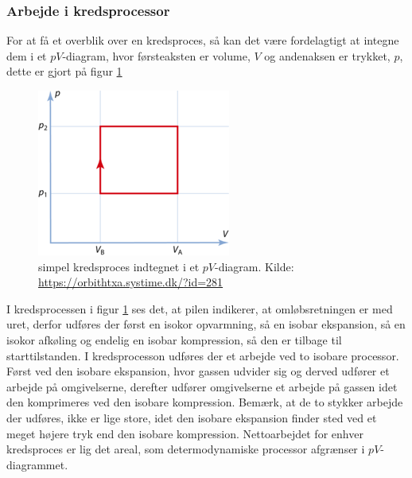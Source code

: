 \documentclass[SRC.tex]{subfiles}
\begin{document}
	\subsubsection{Arbejde i kredsprocessor}
	For at få et overblik over en kredsproces, så kan det være fordelagtigt at 
	integne dem i et \(pV\)-diagram, hvor førsteaksten er volume, \(V\) og 
	andenaksen er trykket, \(p\), dette er gjort på figur \ref{fig:csm044pvdiagram235px7d08cd8d72}
	\begin{figure}[h!]
		\centering
		\includegraphics[scale=0.5]{Billeder/csm_044_PV_diagram_235px_7d08cd8d72}
		\caption{simpel kredsproces indtegnet i et \(pV\)-diagram. Kilde: \url{https://orbithtxa.systime.dk/?id=281}}
		\label{fig:csm044pvdiagram235px7d08cd8d72}
	\end{figure}
	
	I kredsprocessen i figur \ref{fig:csm044pvdiagram235px7d08cd8d72} ses det, at pilen indikerer, at omløbsretningen er med uret, derfor udføres der
	først en isokor opvarmning, så en isobar ekspansion, så en isokor afkøling og
	endelig en isobar kompression, så den er tilbage til starttilstanden. I 
	kredsprocesson udføres der et arbejde ved to isobare processor. Først ved
	den isobare ekspansion, hvor gassen udvider sig og derved udfører et arbejde
	på omgivelserne, derefter udfører omgivelserne et arbejde på gassen idet den 
	komprimeres ved den isobare kompression. Bemærk, at de to stykker arbejde der
	udføres, ikke er lige store, idet den isobare ekspansion finder sted ved et meget
	højere tryk end den isobare kompression. Nettoarbejdet for enhver kredsproces er
	lig det areal, som determodynamiske processor afgrænser i \(pV\)-diagrammet. 
	
\end{document}
